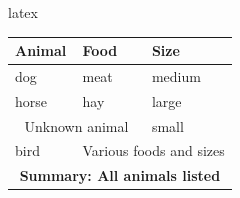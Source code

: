 \documentclass{article}
\begin{document}
latex
\usepackage{array}
\usepackage{booktabs}

\begin{tabular}{lll}
\toprule
Animal & Food & Size \\
\midrule
dog & meat & medium \\
horse & hay & large \\
\multicolumn{2}{c}{Unknown animal} & small \\
bird & \multicolumn{2}{c}{Various foods and sizes} \\
\multicolumn{3}{c}{\textbf{Summary: All animals listed}} \\
\bottomrule
\end{tabular}
\end{document}
